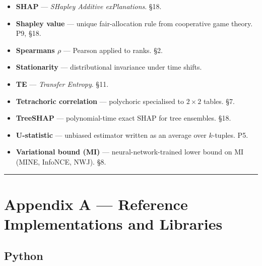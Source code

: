 \documentclass{article}
\let\oldsection\section
\renewcommand{\section}{\clearpage\oldsection}
\begin{document}
\begin{itemize}
\item
  \textbf{SHAP} --- \emph{SHapley Additive exPlanations}. §18.
\item
  \textbf{Shapley value} --- unique fair-allocation rule from
  cooperative game theory. P9, §18.
\item
  \textbf{Spearman\textquotesingle s \(\rho\)} --- Pearson applied to
  ranks. §2.
\item
  \textbf{Stationarity} --- distributional invariance under time shifts.
\item
  \textbf{TE} --- \emph{Transfer Entropy}. §11.
\item
  \textbf{Tetrachoric correlation} --- polychoric specialised to
  \(2 \times 2\) tables. §7.
\item
  \textbf{TreeSHAP} --- polynomial-time exact SHAP for tree ensembles.
  §18.
\item
  \textbf{U-statistic} --- unbiased estimator written as an average over
  \(k\)-tuples. P5.
\item
  \textbf{Variational bound (MI)} --- neural-network-trained lower bound
  on MI (MINE, InfoNCE, NWJ). §8.
\end{itemize}

\begin{center}\rule{0.5\linewidth}{0.5pt}\end{center}

\section{Appendix A --- Reference Implementations and
Libraries}\label{appendix-a--reference-implementations-and-libraries}

\subsection{Python}\label{python}
\end{document}
